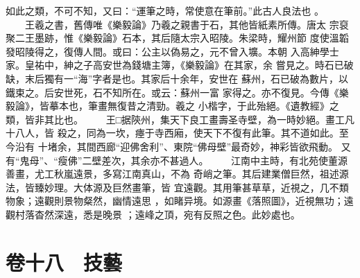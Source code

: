 \documentclass{ctexart}
\begin{document}
如此之類，不可不知，又曰：``運筆之時，常使意在筆前。''此古人良法也 。 　　王羲之書，舊傳唯《樂毅論》乃羲之親書于石，其他皆紙素所傳。唐太 宗裒聚二王墨跡，惟《樂毅論》石本，其后隨太宗入昭陵。朱梁時，耀州節 度使溫韜發昭陵得之，復傳人間。或曰：公主以偽易之，元不曾入壙。本朝 入高紳學士家。皇祐中，紳之子高安世為錢塘主簿，《樂毅論》在其家，余 嘗見之。時石已破缺，末后獨有一``海''字者是也。其家后十余年，安世在 蘇州，石已破為數片，以鐵束之。后安世死，石不知所在。或云：蘇州一富 家得之。亦不復見。今傳《樂毅論》，皆摹本也，筆畫無復昔之清勁。羲之 小楷字，于此殆絕。《遺教經》之類，皆非其比也。 　　王□据陝州，集天下良工畫壽圣寺壁，為一時妙絕。畫工凡十八人，皆 殺之，同為一坎，瘞于寺西廂，使天下不復有此筆。其不道如此。至今沿有 十堵余，其間西廊``迎佛舍利''、東院``佛母壁''最奇妙，神彩皆欲飛動。 又有``鬼母''、``瘦佛''二壁差次，其余亦不甚過人。 　　江南中主時，有北苑使董源善畫，尤工秋嵐遠景，多寫江南真山，不為 奇峭之筆。其后建業僧巨然，祖述源法，皆臻妙理。大体源及巨然畫筆，皆 宜遠觀。其用筆甚草草，近視之，几不類物象；遠觀則景物粲然，幽情遠思 ，如睹异境。如源畫《落照圖》，近視無功；遠觀村落杳然深遠，悉是晚景 ；遠峰之頂，宛有反照之色。此妙處也。
\clearpage
\section{卷十八　技藝}
\end{document}
